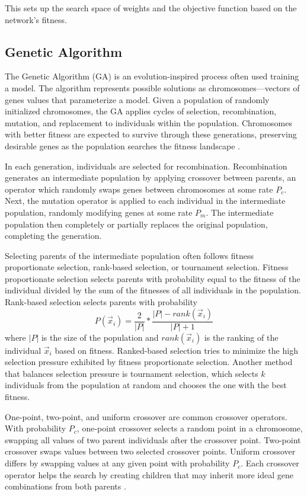 \documentclass[twoside,11pt]{article}
\begin{document}
	This sets up the search space of weights and the objective function based on the network's fitness.

\subsection{Genetic Algorithm}

	The Genetic Algorithm (GA) is an evolution-inspired process often used training a model. 
	The algorithm represents possible solutions as chromosomes---vectors of genes values that parameterize a model. 
	Given a population of randomly initialized chromosomes, the GA applies cycles of selection, recombination, mutation, and replacement to individuals within the population. 
	Chromosomes with better fitness are expected to survive through these generations, preserving desirable genes as the population searches the fitness landscape \citep{ga_tutorial}.

	In each generation, individuals are selected for recombination. 
	Recombination generates an intermediate population by applying crossover between parents, an operator which randomly swaps genes between chromosomes at some rate $P_c$. 
	Next, the mutation operator is applied to each individual in the intermediate population, randomly modifying genes at some rate $P_m$. 
	The intermediate population then completely or partially replaces the original population, completing the generation.

	Selecting parents of the intermediate population often follows fitness proportionate selection, rank-based selection, or tournament selection. 
	Fitness proportionate selection selects parents with probability equal to the fitness of the individual divided by the sum of the fitnesses of all individuals in the population. 
	Rank-based selection selects parents with probability
	$$P(\vec{x}_i) = \frac{2}{|P|} * \frac{|P| - rank(\vec{x}_i)}{|P|+1}$$
	where $|P|$ is the size of the population and $rank(\vec{x}_i)$ is the ranking of the individual $\vec{x}_i$ based on fitness. 
	Ranked-based selection tries to minimize the high selection pressure exhibited by fitness proportionate selection. 
	Another method that balances selection pressure is tournament selection, which selects $k$ individuals from the population at random and chooses the one with the best fitness.

	One-point, two-point, and uniform crossover are common crossover operators. 
	With probability $P_c$, one-point crossover selects a random point in a chromosome, swapping all values of two parent individuals after the crossover point. 
	Two-point crossover swaps values between two selected crossover points. 
	Uniform crossover differs by swapping values at any given point with probability $P_c$. 
	Each crossover operator helps the search by creating children that may inherit more ideal gene combinations from both parents \citep{ga_tutorial}.
\end{document}
